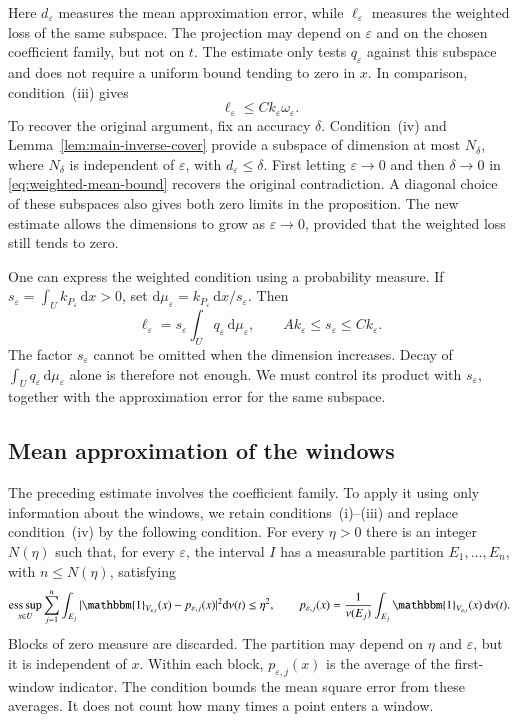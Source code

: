 \documentclass[10pt,a4paper]{amsart}
\def\d{\mathrm{d}}
\newcommand\1{\mathbbm{1}}
\newcommand{\eps}{\varepsilon}
\def\d{\mathrm{d}}
\begin{document}
Here $d_\eps$ measures the mean approximation error, while $\ell_\eps$
measures the weighted loss of the same subspace. The projection may depend
on $\eps$ and on the chosen coefficient family, but not on $t$.
The estimate only tests $q_\eps$ against this subspace and does not require
a uniform bound tending to zero in $x$. In comparison, condition~(iii) gives
\begin{equation*}
    \ell_\eps\le Ck_\eps\omega_\eps.
\end{equation*}
To recover the original argument, fix an accuracy $\delta$. Condition~(iv) and
Lemma~\ref{lem:main-inverse-cover} provide a subspace of dimension at most
$N_\delta$, where $N_\delta$ is independent of $\eps$, with $d_\eps\le\delta$.
First letting $\eps\to0$ and then $\delta\to0$ in
\eqref{eq:weighted-mean-bound} recovers the original contradiction.
A diagonal choice of these subspaces also gives both zero limits in the
proposition. The new estimate allows the dimensions to grow as $\eps\to0$,
provided that the weighted loss still tends to zero.

One can express the weighted condition using a probability measure.
If $s_\eps=\int_U k_{P_\eps}\,\d x>0$, set
$\d\mu_\eps=k_{P_\eps}\,\d x/s_\eps$. Then
\begin{equation*}
    \ell_\eps=s_\eps\int_U q_\eps\,\d\mu_\eps,
    \qquad Ak_\eps\le s_\eps\le Ck_\eps.
\end{equation*}
The factor $s_\eps$ cannot be omitted when the dimension increases.
Decay of $\int_Uq_\eps\,\d\mu_\eps$ alone is therefore not enough.
We must control its product with $s_\eps$, together with the approximation
error for the same subspace.

\subsection{Mean approximation of the windows}

The preceding estimate involves the coefficient family. To apply it using
only information about the windows, we retain conditions~(i)--(iii) and
replace condition~(iv) by the following condition.
For every $\eta>0$ there is an integer $N(\eta)$ such that, for every $\eps$,
the interval $I$ has a measurable partition $E_1,\ldots,E_n$, with
$n\le N(\eta)$, satisfying
\begin{equation}\label{eq:mean-window-partition}
    \operatorname*{ess\,sup}_{x\in U}
    \sum_{j=1}^{n}\int_{E_j}
    |\1_{V_{\eps,t}}(x)-p_{\eps,j}(x)|^2\d\nu(t)\le\eta^2,
    \qquad
    p_{\eps,j}(x)=\frac1{\nu(E_j)}
      \int_{E_j}\1_{V_{\eps,t}}(x)\,\d\nu(t).
\end{equation}
Blocks of zero measure are discarded. The partition may depend on $\eta$
and $\eps$, but it is independent of $x$.
Within each block, $p_{\eps,j}(x)$ is the average of the first-window indicator.
The condition bounds the mean square error from these averages.
It does not count how many times a point enters a window.
\end{document}
